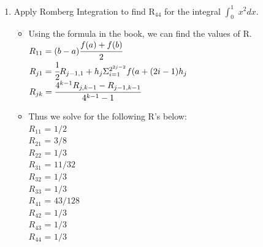 \documentclass[12pt]{article}
\begin{document}
\begin{enumerate}
	\item Apply Romberg Integration to find R$_{44}$ for the integral $\int_0^1$ $x^2dx$.
	\begin{itemize}
		\item Using the formula in the book, we can find the values of R. \\
		$R_{11} = (b-a)\cfrac{f(a)+f(b)}{2}$ \\
		$R_{j1} = \cfrac{1}{2}R_{j-1,1}+h_j\Sigma_{i=1}^{2^{2j-2}} f(a+(2i-1)h_j$ \\
		$R_{jk} = \cfrac{4^{k-1}R_{j,k-1}-R_{j-1,k-1}}{4^{k-1}-1}$ 
		\item Thus we solve for the following R's below: \\
		$R_{11}$ = $1/2$ \\
		$R_{21}$ = $3/8$ \\
		$R_{22}$ = $1/3$ \\
		$R_{31}$ = $11/32$ \\
		$R_{32}$ = $1/3$ \\
		$R_{33}$ = $1/3$ \\
		$R_{41}$ = $43/128$ \\
		$R_{42}$ = $1/3$ \\
		$R_{43}$ = $1/3$ \\
		$R_{44}$ = $1/3$ \\
	\end{itemize}
\end{enumerate}
\end{document}
